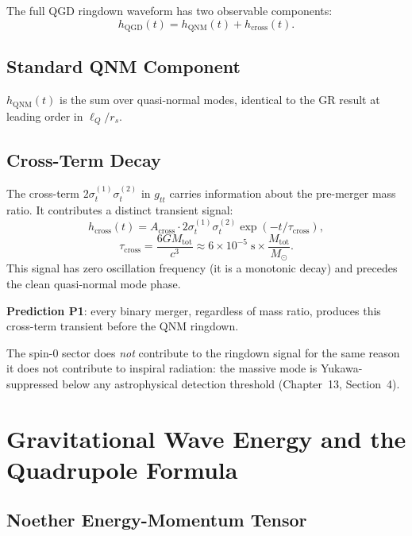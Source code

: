 \documentclass[12pt,a4paper]{article}
\newcommand{\lQ}{\ell_Q}
\newcommand{\Msun}{M_{\odot}}
\begin{document}
The full QGD ringdown waveform has two observable components:
\begin{equation}
  \boxed{h_\mathrm{QGD}(t) = h_\mathrm{QNM}(t) + h_\mathrm{cross}(t).}
\end{equation}

\subsection{Standard QNM Component}

$h_\mathrm{QNM}(t)$ is the sum over quasi-normal modes, identical to the GR result
at leading order in $\lQ/r_s$.

\subsection{Cross-Term Decay}

The cross-term $2\sigma_t^{(1)}\sigma_t^{(2)}$ in $g_{tt}$ carries information
about the pre-merger mass ratio. It contributes a distinct transient signal:
\begin{equation}
  h_\mathrm{cross}(t) = A_\mathrm{cross}\cdot 2\sigma_t^{(1)}\sigma_t^{(2)}
    \exp(-t/\tau_\mathrm{cross}),
\end{equation}
\begin{equation}
  \boxed{\tau_\mathrm{cross} = \frac{6GM_\mathrm{tot}}{c^3}
    \approx 6\times10^{-5}\;\mathrm{s}\times\frac{M_\mathrm{tot}}{\Msun}.}
\end{equation}
This signal has zero oscillation frequency (it is a monotonic decay) and precedes
the clean quasi-normal mode phase.

\medskip
\noindent\textbf{Prediction P1}: every binary merger, regardless of mass ratio, produces
this cross-term transient before the QNM ringdown.

\medskip
\noindent The spin-0 sector does \emph{not} contribute to the ringdown signal for the
same reason it does not contribute to inspiral radiation: the massive mode is
Yukawa-suppressed below any astrophysical detection threshold (Chapter~13, Section~4).

\section{Gravitational Wave Energy and the Quadrupole Formula}

\subsection{Noether Energy-Momentum Tensor}
\end{document}

